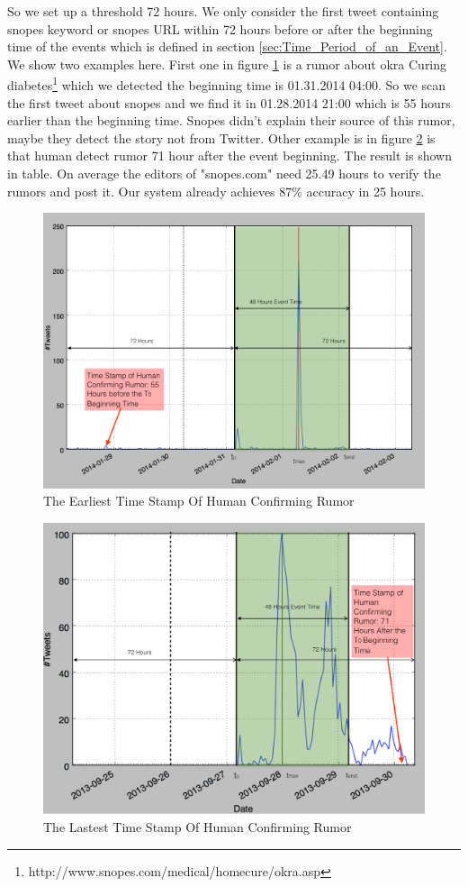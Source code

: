     So we set up a threshold 72 hours. We only consider the first tweet containing snopes keyword or snopes URL within 72 hours before or after the beginning time of the events which is defined in section \ref{sec:Time_Period_of_an_Event}. We show two examples here. First one in figure \ref{fig:ealiset_rumo} is a rumor about okra Curing diabetes\footnote{http://www.snopes.com/medical/homecure/okra.asp} which we detected the beginning time is 01.31.2014 04:00. So we scan the first tweet about snopes and we find it in 01.28.2014 21:00 which is 55 hours earlier than the beginning time. Snopes didn't explain their source of this rumor, maybe they detect the story not from Twitter. 
    Other example is in figure \ref{fig:lastest_rumo} is that  human detect rumor 71 hour after the event beginning.  
    The result is shown in table. On average the editors of "snopes.com" need 25.49 hours to verify the rumors and post it. Our system already achieves 87\% accuracy in 25 hours. 
     \begin{figure}[!h]
\centering
\includegraphics[width=\columnwidth]{images/Timestamphummanearlist.png}
\caption{The Earliest Time Stamp Of Human Confirming Rumor}
\label{fig:ealiset_rumo}
\end{figure} 
  \begin{figure}[!h]
\centering
\includegraphics[width=\columnwidth]{images/Timestamphummanlatest.png}
\caption{The Lastest Time Stamp Of Human Confirming Rumor}
\label{fig:lastest_rumo}
\end{figure} 

